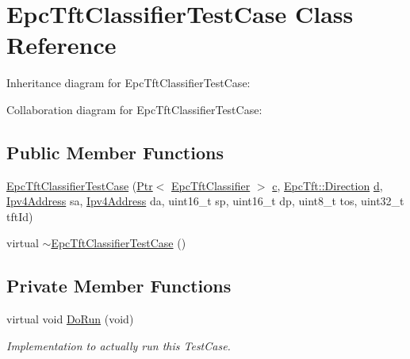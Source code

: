 \hypertarget{classEpcTftClassifierTestCase}{}\section{Epc\+Tft\+Classifier\+Test\+Case Class Reference}
\label{classEpcTftClassifierTestCase}


Inheritance diagram for Epc\+Tft\+Classifier\+Test\+Case\+:


Collaboration diagram for Epc\+Tft\+Classifier\+Test\+Case\+:
\subsection*{Public Member Functions}
\begin{DoxyCompactItemize}
\item 
\hyperlink{classEpcTftClassifierTestCase_ae016e7ada2ef328d1d9b1f70d5df288d}{Epc\+Tft\+Classifier\+Test\+Case} (\hyperlink{classns3_1_1Ptr}{Ptr}$<$ \hyperlink{classns3_1_1EpcTftClassifier}{Epc\+Tft\+Classifier} $>$ \hyperlink{mmwave_2model_2fading-traces_2fading__trace__generator_8m_ae0323a9039add2978bf5b49550572c7c}{c}, \hyperlink{classns3_1_1EpcTft_a6037510585658e017a8011862ce56946}{Epc\+Tft\+::\+Direction} \hyperlink{lte__pathloss_8m_a1aabac6d068eef6a7bad3fdf50a05cc8}{d}, \hyperlink{classns3_1_1Ipv4Address}{Ipv4\+Address} sa, \hyperlink{classns3_1_1Ipv4Address}{Ipv4\+Address} da, uint16\+\_\+t sp, uint16\+\_\+t dp, uint8\+\_\+t tos, uint32\+\_\+t tft\+Id)
\item 
virtual \hyperlink{classEpcTftClassifierTestCase_a4c5106bf0975727a3fe2578d08ae4232}{$\sim$\+Epc\+Tft\+Classifier\+Test\+Case} ()
\end{DoxyCompactItemize}
\subsection*{Private Member Functions}
\begin{DoxyCompactItemize}
\item 
virtual void \hyperlink{classEpcTftClassifierTestCase_a51faba0aef8aaa1d7fef2ac1d3e5aa5d}{Do\+Run} (void)
\begin{DoxyCompactList}\small\item\em Implementation to actually run this Test\+Case. \end{DoxyCompactList}\end{DoxyCompactItemize}
